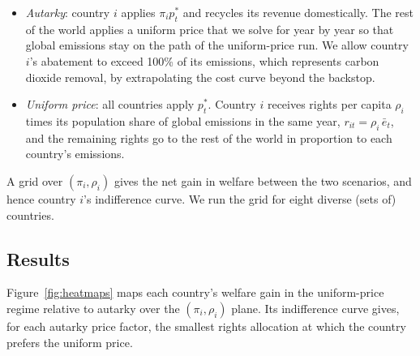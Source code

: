 \documentclass[12pt,english]{article}
\theoremstyle{remark}
\begin{document}
\begin{itemize}
  \item \emph{Autarky}: country $i$ applies $\pi_i p^*_t$ and recycles its revenue domestically. The rest of the world applies a uniform price that we solve for year by year so that global emissions stay on the path of the uniform-price run. 
  We allow country $i$'s abatement to exceed 100\% of its emissions, which represents carbon dioxide removal, by extrapolating the cost curve beyond the backstop. %
  \item \emph{Uniform price}: all countries apply $p^*_t$. Country $i$ receives rights per capita $\rho_i$ times its population share of global emissions in the same year, $r_{it}=\rho_i\,\bar e_t$, %
  and the remaining rights go to the rest of the world in proportion to each country's emissions. 
\end{itemize}

A grid over $(\pi_i,\rho_i)$ gives the net gain in welfare between the two scenarios, %
and hence country $i$'s indifference curve. We run the grid for eight diverse (sets of) countries. %

\subsection{Results}

Figure~\ref{fig:heatmaps} maps each country's welfare gain in the uniform-price regime relative to autarky over the $(\pi_i,\rho_i)$ plane. Its indifference curve gives, for each autarky price factor, the smallest rights allocation at which the country prefers the uniform price.
\end{document}
